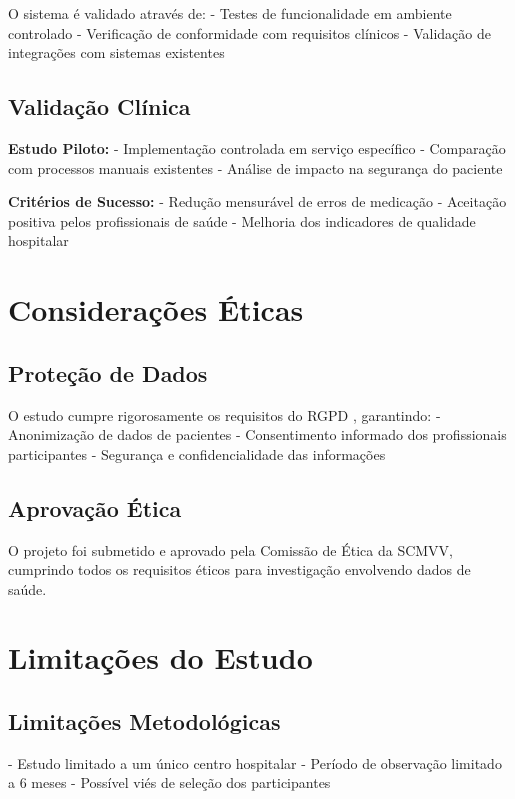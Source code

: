 O sistema é validado através de:
- Testes de funcionalidade em ambiente controlado
- Verificação de conformidade com requisitos clínicos
- Validação de integrações com sistemas existentes

\subsection{Validação Clínica}

\textbf{Estudo Piloto:}
- Implementação controlada em serviço específico
- Comparação com processos manuais existentes
- Análise de impacto na segurança do paciente

\textbf{Critérios de Sucesso:}
- Redução mensurável de erros de medicação
- Aceitação positiva pelos profissionais de saúde
- Melhoria dos indicadores de qualidade hospitalar

\section{Considerações Éticas}

\subsection{Proteção de Dados}

O estudo cumpre rigorosamente os requisitos do RGPD \cite{european2016}, garantindo:
- Anonimização de dados de pacientes
- Consentimento informado dos profissionais participantes
- Segurança e confidencialidade das informações

\subsection{Aprovação Ética}

O projeto foi submetido e aprovado pela Comissão de Ética da SCMVV, cumprindo todos os requisitos éticos para investigação envolvendo dados de saúde.

\section{Limitações do Estudo}

\subsection{Limitações Metodológicas}

- Estudo limitado a um único centro hospitalar
- Período de observação limitado a 6 meses
- Possível viés de seleção dos participantes

